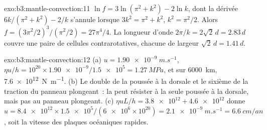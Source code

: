 \begin{solution}{exo:b3:mantle-convection:11}
$\ln f = 3\ln(\pi^2 + k^2) - 2\ln k$, dont la dérivée $6k/(\pi^2 + k^2) - 2/k$
s'annule lorsque $3k^2 = \pi^2 + k^2$, $k^2 = \pi^2/2$. Alors $f = (3\pi^2/2)^3/
(\pi^2/2) = 27\pi^4/4$. La longueur d'onde $2\pi/k = 2\sqrt2\,d = 2.83\,d$ couvre
une paire de cellules contrarotatives, chacune de largeur $\sqrt2\,d = 1.41\,d$.
\end{solution}

\begin{solution}{exo:b3:mantle-convection:12}
(a) $u = \qty{1.90e-9}{m.s^{-1}}$, $\eta u/h = 10^{20}\times\num{1.90e-9}/
\num{1.5e5} = \qty{1.27}{MPa}$, et sur \qty{6000}{km}, \qty{7.6e12}{N.m^{-1}}.
(b) Le double de la poussée à la dorsale et le sixième de la traction du panneau plongeant~: la  peut résister
à la seule poussée à la dorsale, mais pas au panneau plongeant. (c) $\eta uL/h = \num{3.8e12} +
\num{4.6e12}$ donne $u = \num{8.4e12}\times\num{1.5e5}/(\num{6e6}\times10^{20})
= \qty{2.1e-9}{m.s^{-1}} = \qty{6.6}{cm/an}$, soit la vitesse des
plaques océaniques rapides.
\end{solution}


